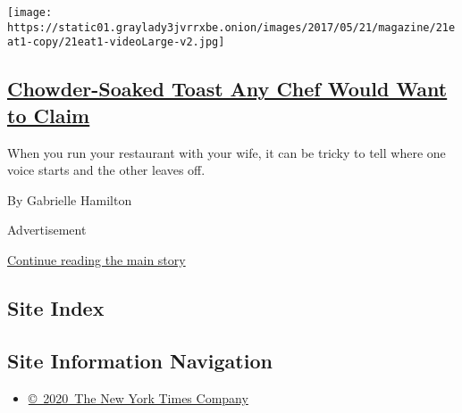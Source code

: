 \begin{enumerate}
  \texttt{[image: https://static01.graylady3jvrrxbe.onion/images/2017/05/21/magazine/21eat1-copy/21eat1-videoLarge-v2.jpg]}

  \hypertarget{chowder-soaked-toast-any-chef-would-want-to-claim}{%
  \subsection{\texorpdfstring{\href{/2017/05/18/magazine/chowder-soaked-toast-any-chef-would-want-to-claim.html}{Chowder-Soaked
  Toast Any Chef Would Want to
  Claim}}{Chowder-Soaked Toast Any Chef Would Want to Claim}}\label{chowder-soaked-toast-any-chef-would-want-to-claim}}

  When you run your restaurant with your wife, it can be tricky to tell
  where one voice starts and the other leaves off.

  By Gabrielle Hamilton
\end{enumerate}

Advertisement

\protect\hyperlink{after-mid1}{Continue reading the main story}

\hypertarget{site-index}{%
\subsection{Site Index}\label{site-index}}

\hypertarget{site-information-navigation}{%
\subsection{Site Information
Navigation}\label{site-information-navigation}}

\begin{itemize}
\tightlist
\item
  \href{https://help.nytimes3xbfgragh.onion/hc/en-us/articles/115014792127-Copyright-notice}{©~2020~The
  New York Times Company}
\end{itemize}

